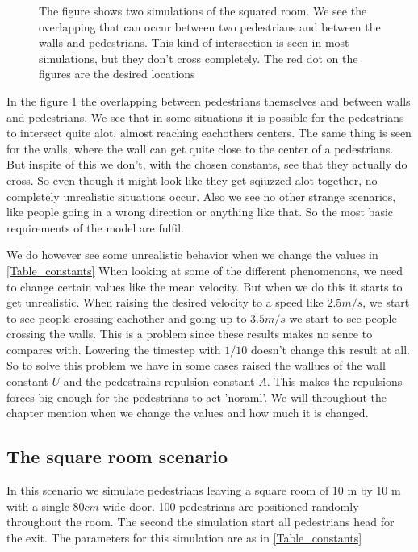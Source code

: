 \begin{figure}[h]
\caption{The figure shows two simulations of the squared room. We see the overlapping that can occur between two pedestrians and between the walls and pedestrians. This kind of intersection is seen in most simulations, but they don't cross completely. The red dot on the figures are the desired locations}
\label{fig:overlapping}
\end{figure}

In the figure \ref{fig:overlapping} the overlapping between pedestrians themselves and between walls and pedestrians. 
We see that in some situations it is possible for the pedestrians to intersect quite alot, almost reaching eachothers
 centers. The same thing is seen for the walls, where the wall can get quite close to the center of a pedestrians. 
But inspite of this we don't, with the chosen constants, see that they actually do cross. So even though it might 
look like they get sqiuzzed alot together, no completely unrealistic situations occur. Also we see no other strange
 scenarios, like people going in a wrong direction or anything like that. So the most basic requirements of the model 
are fulfil. 

We do however see some unrealistic behavior when we change the values in \ref{Table_constants} When looking at some of
 the different phenomenons, we need to change certain values like the mean velocity. But when we do this it starts to
 get unrealistic. When raising the desired velocity to a speed like $2.5m/s$, we start to see people crossing eachother 
and going up to $3.5m/s$ we start to see people crossing the walls. This is a problem since these results makes no sence to
compares with. Lowering the timestep with $1/10$ doesn't change this result at all. So to solve this problem we have in some
 cases raised the wallues of the wall constant $U$ and the pedestrains repulsion constant $A$. This makes the repulsions forces 
big enough for the pedestrians to act 'noraml'. We will throughout the chapter mention when we change the values and how much it is changed.



\subsection{The square room scenario}
In this scenario we simulate pedestrians leaving a square room of 10 m by 10 m with a single $80cm$ wide door. 100 pedestrians are positioned randomly throughout the room. The second the simulation start all pedestrians head for the exit. The parameters for this simulation are as in \ref{Table_constants}


